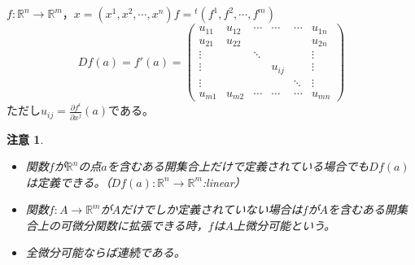 \documentclass[dvipdfmx,a4j,10pt]{jsarticle}
\theoremstyle{mystyle1}
\theoremstyle{mystyle2}
\newtheorem{note}{注意}
\begin{document}
$f:\mathbb{R}^n\to\mathbb{R}^m$，$x=(x^1,x^2,\cdots,x^n)$$f={}^{t}(f^1,f^2,\cdots,f^m)$
\[
Df(a)=f'(a)=
\begin{pmatrix}
u_{11} & u_{12} & \cdots & \cdots & \cdots & u_{1n}\\
u_{21} & u_{22} &        &        &        & u_{2n} \\
\vdots &        & \ddots &        &        & \vdots \\
\vdots &        &        & u_{ij} &        & \vdots \\
\vdots &        &        &        & \ddots & \vdots \\
u_{m1} & u_{m2} & \cdots & \cdots & \cdots & u_{mn}
\end{pmatrix}
\]
ただし$\displaystyle u_{ij}=\frac{\partial f^i}{\partial x^j}(a)$である。

\begin{note}\
	\begin{itemize}
		\item 関数$f$が$\mathbb{R}^n$の点$a$を含むある開集合上だけで定義されている場合でも$Df(a)$は定義できる。（$Df(a):\mathbb{R}^n\to\mathbb{R}^m$:linear）
		\item 関数$f:A\to\mathbb{R}^m$が$A$だけでしか定義されていない場合は$f$が$A$を含むある開集合上の可微分関数に拡張できる時，$f$は$A$上微分可能という。
		\item 全微分可能ならば連続である。
	\end{itemize}
\end{note}
\end{document}
